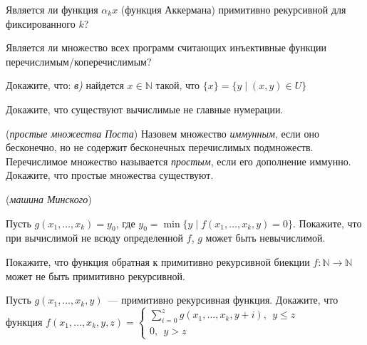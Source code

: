 \setcounter{curtask}{30}


\begin{task}
    Является ли функция $\alpha_k{x}$ (функция Аккермана) примитивно
    рекурсивной для фиксированного $k$?
\end{task}

\begin{task}
	Является ли множество всех программ считающих инъективные функции
    перечислимым/коперечислимым?    
\end{task}

\breakline

\begin{ptask}{19}
    Докажите, что:
    {\it в)} найдется $x \in \mathbb{N}$ такой, что $\{x\} = \{y
    \mid (x, y) \in U\}$
\end{ptask}

\begin{ptask}{20}
    Докажите, что существуют вычислимые не главные нумерации.
\end{ptask}

\begin{ptask}{23} ({\it простые множества Поста})
    Назовем множество {\it иммунным}, если оно бесконечно, но не
    содержит бесконечных перечислимых подмножеств. Перечислимое
    множество называется {\it простым}, если его дополнение иммунно.
    Докажите, что простые множества существуют.
\end{ptask}

\begin{ptask}{24} ({\it машина Минского})
\end{ptask}

\begin{ptask}{25}
    Пусть $g(x_1, \dots, x_k) = y_0$, где $y_0 = \min \{y \mid f(x_1,
      \dots, x_k, y) = 0\}$. Покажите, что при вычислимой не всюду
      определенной $f$, $g$ может быть невычислимой.
\end{ptask}

\begin{ptask}{26}
    Покажите, что функция обратная к примитивно рекурсивной биекции
    $f: \mathbb{N} \rightarrow \mathbb{N}$
    может не быть примитивно рекурсивной.
\end{ptask}

\begin{ptask}{27}
	Пусть $g(x_1, \dots, x_k, y)$~--- примитивно рекурсивная функция.
    Докажите, что функция $f(x_1, \dots, x_k, y, z) =
	\begin{cases}
		\sum\limits_{i = 0}^{z} g(x_1, \dots, x_k, y + i),~~ y \le z  \\
		0,~~ y > z
	\end{cases}$
\end{ptask}